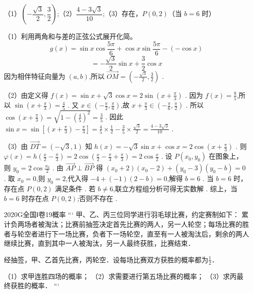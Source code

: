 \documentclass[12pt,UTF-8,a4paper]{ctexart}
\numberwithin{figure}{section}
\theoremstyle{mystyle}
\theoremstyle{mystylekaishu}
\theoremstyle{mystyle}
\numberwithin{xiti}{section}
\begin{document}
\begin{answer}
（1）$\boxed{\left(-\dfrac{\sqrt{3}}{2}, \dfrac{3}{2}\right)}$;（2）$\boxed{\dfrac{4-3\sqrt{3}}{10}}$;（3）存在，$\boxed{P(0,2)}$（当 $b=6$ 时）
\end{answer}

\begin{solutions}
（1）利用两角和与差的正弦公式展开化简。
$$
g(x)=\sin x\cos\frac{5\pi}{6}+\cos x\sin\frac{5\pi}{6}-(-\cos x)
$$
$$
=-\frac{\sqrt{3}}{2}\sin x+\frac{3}{2}\cos x
$$
因为相伴特征向量为 $(a,b)$,所以 $\overrightarrow{OM}=\left(-\frac{\sqrt{3}}{2}, \frac{3}{2}\right)$ .

（2）由定义得 $f(x)=\sin x+\sqrt{3}\cos x=2\sin\left(x+\frac{\pi}{3}\right)$ .
因为 $f(x)=\frac{8}{5}$,所以 $\sin\left(x+\frac{\pi}{3}\right)=\frac{4}{5}$ .
又 $x\in\left(-\frac{\pi}{2}, \frac{\pi}{6}\right)$,故 $x+\frac{\pi}{3}\in\left(-\frac{\pi}{6}, \frac{\pi}{2}\right)$ .
所以 $\cos\left(x+\frac{\pi}{3}\right)=\sqrt{1-\left(\frac{4}{5}\right)^2}=\frac{3}{5}$ .
因此 $\sin x=\sin\left[\left(x+\frac{\pi}{3}\right)-\frac{\pi}{3}\right]=\frac{4}{5}\times\frac{1}{2}-\frac{3}{5}\times\frac{\sqrt{3}}{2}=\frac{4-3\sqrt{3}}{10}$ .

（3）由 $\overrightarrow{DT}=(-\sqrt{3},1)$ 知 $h(x)=-\sqrt{3}\sin x+\cos x=2\cos\left(x+\frac{\pi}{3}\right)$ .
则 $\varphi(x)=h\left(\frac{x}{2}-\frac{\pi}{3}\right)=2\cos\left(\frac{x}{2}-\frac{\pi}{3}+\frac{\pi}{3}\right)=2\cos\frac{x}{2}$ .
设 $P(x_0,y_0)$ 在图象上，则 $y_0=2\cos\frac{x_0}{2}$ .
由 $\overrightarrow{AP}\perp\overrightarrow{BP}$ 得 $(x_0+2)(x_0-2)+(y_0-3)(y_0-b)=0$ .
取 $x_0=0$,则 $y_0=2$,代入得 $-4+(-1)(2-b)=0$,解得 $b=6$ .
当 $b=6$ 时，存在点 $P(0,2)$ 满足条件 .
若 $b\neq 6$,联立方程组分析可得无实数解 .
综上，当 $b=6$ 时存在点 $P(0,2)$;否则不存在 .
\end{solutions}


\begin{problem}{2020}{G}{全国Ⅰ卷}{19}{概率}
```
甲、乙、丙三位同学进行羽毛球比赛，约定赛制如下：  
累计负两场者被淘汰；比赛前抽签决定首先比赛的两人，另一人轮空；每场比赛的胜者与轮空者进行下一场比赛，负者下一场轮空，直至有一人被淘汰后，剩余的两人继续比赛，直到其中一人被淘汰，另一人最终获胜，比赛结束．  

经抽签，甲、乙首先比赛，丙轮空．设每场比赛双方获胜的概率都为$\frac{1}{2}$．  

（1）求甲连胜四场的概率；  
（2）求需要进行第五场比赛的概率；  
（3）求丙最终获胜的概率．
```
\end{problem}
\end{document}
